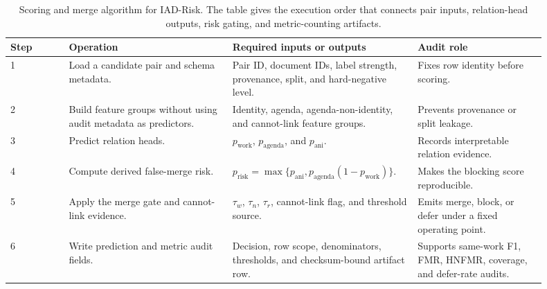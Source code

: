 \documentclass[11pt]{article}
\begin{document}
\begin{table}[H]
\caption{Scoring and merge algorithm for IAD-Risk. The table gives the execution order that connects pair inputs, relation-head outputs, risk gating, and metric-counting artifacts.}
\label{tab:scoring-merge-algorithm}
\centering
\footnotesize
\setlength{\tabcolsep}{3pt}
\begin{tabular}{L{0.10\linewidth}L{0.28\linewidth}L{0.30\linewidth}L{0.22\linewidth}}
\toprule
Step & Operation & Required inputs or outputs & Audit role \\
 & Load a candidate pair and schema metadata. & Pair ID, document IDs, label strength, provenance, split, and hard-negative level. & Fixes row identity before scoring. \\
2 & Build feature groups without using audit metadata as predictors. & Identity, agenda, agenda-non-identity, and cannot-link feature groups. & Prevents provenance or split leakage. \\
3 & Predict relation heads. & $p_{\mathrm{work}}$, $p_{\mathrm{agenda}}$, and $p_{\mathrm{ani}}$. & Records interpretable relation evidence. \\
4 & Compute derived false-merge risk. & $p_{\mathrm{risk}}=\max\{p_{\mathrm{ani}},p_{\mathrm{agenda}}(1-p_{\mathrm{work}})\}$. & Makes the blocking score reproducible. \\
5 & Apply the merge gate and cannot-link evidence. & $\tau_w$, $\tau_n$, $\tau_r$, cannot-link flag, and threshold source. & Emits merge, block, or defer under a fixed operating point. \\
6 & Write prediction and metric audit fields. & Decision, row scope, denominators, thresholds, and checksum-bound artifact row. & Supports same-work F1, FMR, HNFMR, coverage, and defer-rate audits. \\
\bottomrule
\end{tabular}
\end{table}
\end{document}

